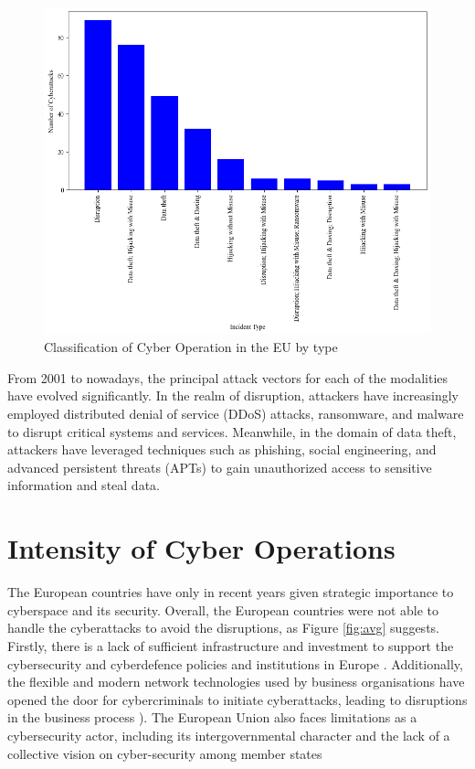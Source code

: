 \begin{figure}[H]
    \centering
    \includegraphics[width=\textwidth]{Images/eu_type.png}
    \caption{Classification of Cyber Operation in the EU by type}
    \label{fig:eu_type}
\end{figure}

From 2001 to nowadays, the principal attack vectors for each of the modalities have evolved significantly. In the realm of disruption, attackers have increasingly employed distributed denial of service (DDoS) attacks, ransomware, and malware to disrupt critical systems and services. Meanwhile, in the domain of data theft, attackers have leveraged techniques such as phishing, social engineering, and advanced persistent threats (APTs) to gain unauthorized access to sensitive information and steal data. 

\section{Intensity of Cyber Operations}

The European countries have only in recent years given strategic importance to cyberspace and its security. Overall, the European countries were not able to handle the cyberattacks to avoid the disruptions, as Figure \ref{fig:avg} suggests. Firstly, there is a lack of sufficient infrastructure and investment to support the cybersecurity and cyberdefence policies and institutions in Europe \autocite{petratos_2014_cybersecurity}.  Additionally, the flexible and modern network technologies used by business organisations have opened the door for cybercriminals to initiate cyberattacks, leading to disruptions in the business process \autocite{sudar_2020_analysis}). The European Union also faces limitations as a cybersecurity actor, including its intergovernmental character and the lack of a collective vision on cyber-security among member states \autocite{sliwinski_2014_moving}


